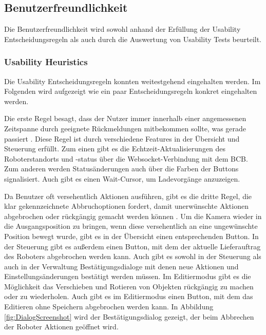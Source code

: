 \subsection{Benutzerfreundlichkeit}
Die Benutzerfreundlichkeit wird sowohl anhand der Erfüllung der Usability Entscheidungsregeln als auch durch die Auswertung von Usability Tests beurteilt.

\subsubsection{Usability Heuristics}\label{sec:UsabilityHeuristics}
Die Usability Entscheidungsregeln konnten weitestgehend eingehalten werden. Im Folgenden wird aufgezeigt wie ein paar Entscheidungsregeln konkret eingehalten werden.

Die erste Regel besagt, dass der Nutzer immer innerhalb einer angemessenen Zeitspanne durch geeignete Rückmeldungen mitbekommen sollte, was gerade passiert \cite[Regel 1]{Nielsen.1994}. Diese Regel ist durch verschiedene Features in der Übersicht und Steuerung erfüllt. Zum einen gibt es die Echtzeit-Aktualisierungen des Roboterstandorts und -status über die \gls{Websocket}-Verbindung mit dem \ac{BCB}. Zum anderen werden Statusänderungen auch über die Farben der Buttons signalisiert. Auch gibt es einen Wait-Cursor, um Ladevorgänge anzuzeigen.


Da Benutzer oft versehentlich Aktionen ausführen, gibt es die dritte Regel, die klar gekennzeichnete Abbruchoptionen fordert, damit unerwünschte Aktionen abgebrochen oder rückgängig gemacht werden können \cite[Regel 3]{Nielsen.1994}. Um die Kamera wieder in die Ausgangsposition zu bringen, wenn diese versehentlich an eine ungewünschte Position bewegt wurde, gibt es in der Übersicht einen entsprechenden Button. In der Steuerung gibt es außerdem einen Button, mit dem der aktuelle Lieferauftrag des Roboters abgebrochen werden kann. Auch gibt es sowohl in der Steuerung als auch in der Verwaltung Bestätigungsdialoge mit denen neue Aktionen und Einstellungsänderungen bestätigt werden müssen. Im Editiermodus gibt es die Möglichkeit das Verschieben und Rotieren von Objekten rückgängig zu machen oder zu wiederholen. Auch gibt es im Editiermodus einen Button, mit dem das Editieren ohne Speichern abgebrochen werden kann. In Abbildung \ref{fig:DialogScreenshot} wird der Bestätigungsdialog gezeigt, der beim Abbrechen der Roboter Aktionen geöffnet wird.

